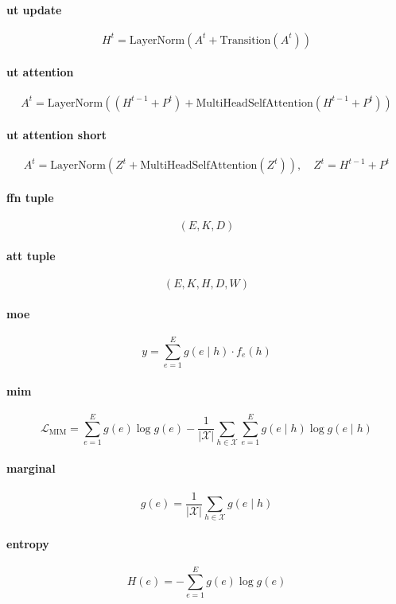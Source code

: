 \documentclass{article}
\begin{document}
\paragraph{ut update}
\[
H^t=\mathrm{LayerNorm}\!\left(A^t+\mathrm{Transition}(A^t)\right)
\]

\paragraph{ut attention}
\[
A^t=\mathrm{LayerNorm}\!\left((H^{t-1}+P^t)+\mathrm{MultiHeadSelfAttention}(H^{t-1}+P^t)\right)
\]

\paragraph{ut attention short}
\[
A^t=\mathrm{LayerNorm}\!\left(Z^t+\mathrm{MultiHeadSelfAttention}(Z^t)\right),\quad Z^t=H^{t-1}+P^t
\]

\paragraph{ffn tuple}
\[
(E,K,D)
\]

\paragraph{att tuple}
\[
(E,K,H,D,W)
\]

\paragraph{moe}
\[
y=\sum_{e=1}^{E}g(e\mid h)\cdot f_e(h)
\]

\paragraph{mim}
\[
\mathcal{L}_{\mathrm{MIM}}=\sum_{e=1}^{E}g(e)\log g(e)-\frac{1}{|\mathcal{X}|}\sum_{h\in\mathcal{X}}\sum_{e=1}^{E}g(e\mid h)\log g(e\mid h)
\]

\paragraph{marginal}
\[
g(e)=\frac{1}{|\mathcal{X}|}\sum_{h\in\mathcal{X}}g(e\mid h)
\]

\paragraph{entropy}
\[
H(e)=-\sum_{e=1}^{E}g(e)\log g(e)
\]
\end{document}
